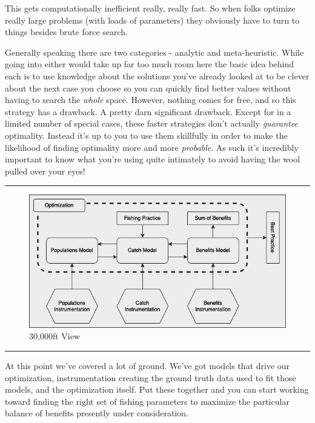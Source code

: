 \documentclass[11pt,a5paper]{book}
\begin{document}
This gets computationally inefficient really, really fast. So when folks optimize really large problems (with loads of parameters) they obviously have to turn to things besides brute force search.
\newline

Generally speaking there are two categories - analytic and meta-heuristic. While going into either would take up far too much room here the basic idea behind each is to use knowledge about the solutions you've already looked at to be clever about the next case you choose so you can quickly find better values without having to search the \textit{whole} space. However, nothing comes for free, and so this strategy has a drawback. A pretty darn significant drawback. Except for in a limited number of special cases, these faster strategies don't actually \textit{guarantee} optimality. Instead it's up to you to use them skillfully in order to make the likelihood of finding optimality more and more \textit{probable}. As such it's incredibly important to know what you're using quite intimately to avoid having the wool pulled over your eyes!
\newpage

\noindent \rule{\textwidth}{0.5pt} 
\begin{figure}[h!] 
  \includegraphics[width=\linewidth]{drawings/high_level.png}
  \caption{30,000ft View}
  \label{fig:high_level}
\end{figure}
\newline
\rule{\textwidth}{0.5pt} 
\vspace{5pt}

At this point we've covered a lot of ground. We've got models that drive our optimization, instrumentation creating the ground truth data used to fit those models, and the optimization itself. Put these together and you can start working toward finding the right set of fishing parameters to maximize the particular balance of benefits presently under consideration. 
\newline
\end{document}
